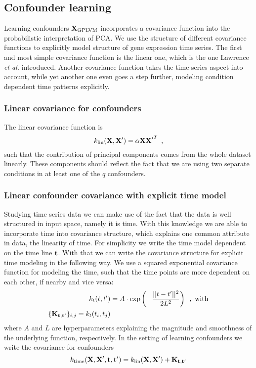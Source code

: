 \documentclass[11pt,a4paper,titlepage,twoside,tablecaptionabove]{article}
\begin{document}
\subsection{Confounder learning}
\label{sec:confounder-learning}

Learning confounders ${\bf X}_\text{GPLVM}$ incorporates a covariance
function into the probabilistic interpretation of PCA. We use
the structure of different covariance functions to explicitly model
structure of gene expression time series. The first and most simple
covariance function is the linear one, which is the one Lawrence {\it
  et al.} \cite{lawrence2004gaussian} introduced. Another covariance
function takes the time series aspect into account, while yet
another one even goes a step further, modeling condition dependent
time patterns explicitly.

\subsubsection{Linear covariance for confounders}
\label{sec:line-covar-conf}

The linear covariance function is
\begin{equation}
  \label{eq:5}
  k_\text{lin}({\bf X},{\bf X'}) = \alpha {\bf X}{\bf X'}^T\enspace,
\end{equation}
such that the contribution of principal components comes from the
whole dataset linearly. These components should reflect the fact that
we are using two separate conditions in at least one of the $q$
confounders. 

\subsubsection{Linear confounder covariance with explicit time model}
\label{sec:line-conf-covar}

Studying time series data we can make use of the fact that the data is
well structured in input space, namely it is time. With this knowledge
we are able to incorporate time into covariance structure, which
explains one common attribute in data, the linearity of time. For
simplicity we write the time model dependent on the time line $\bf
t$. With that we can write the covariance structure for explicit time
modeling in the following way. We use a squared exponential covariance
function for modeling the time, such that the time points are more dependent
on each other, if nearby and vice versa:
\begin{align}
  \label{eq:6}
  k_t(t,t') & =
  A\cdot\exp\left(-\frac{||t-t'||^2}{2L^2}\right)\enspace,\text{
    with}\\
  \{{\bf K}_{\bf t,t'}\}_{i,j} = k_t(t_i,t_j)
\end{align}
where $A$ and $L$ are hyperparameters explaining the magnitude and
smoothness of the underlying function, respectively. In the setting of
learning confounders we write the covariance for confounders
\begin{equation}
  \label{eq:7}
  k_\text{time}({\bf X},{\bf X'},{\bf t,t'}) = k_\text{lin}({\bf
    X,X'}) + {\bf K_{\bf t,t'}}
\end{equation}

 
\end{document}
